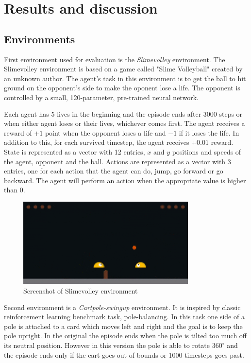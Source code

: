 \chapter{Results and discussion}
\section{Environments}

First environment used for evaluation is the \emph{Slimevolley} environment. The Slimevolley environment \cite{slimevolleygym} is based on a game called "Slime Volleyball" created by an unknown author. The agent's task in this environment is to get the ball to hit ground on the opponent's side to make the oponent lose a life. The opponent is controlled by a small, 120-parameter, pre-trained neural network. \cite{ha2015slimevolley}

Each agent has 5 lives in the beginning and the episode ends after 3000 steps or when either agent loses or their lives, whichever comes first. The agent receives a reward of $+1$ point when the opponent loses a life and $-1$ if it loses the life. In addition to this, for each survived timestep, the agent receives $+0.01$  reward. State is represented as a vector with 12 entries, $x$ and $y$ positions and speeds of the agent, opponent and the ball. Actions are represented as a vector with 3 entries, one for each action that the agent can do, jump, go forward or go backward. The agent will perform an action when the appropriate value is higher than 0.

\begin{figure}[h]
    \caption{Screenshot of Slimevolley environment}
    \includegraphics[width=0.8\textwidth]{img/slimevolley.png}
\end{figure}

Second environment is a \emph{Cartpole-swingup} environment. It is inspired by classic reinforcement learning benchmark task, pole-balancing. In this task one side of a pole is attached to a card which moves left and right and the goal is to keep the pole upright. In the original the episode ends when the pole is tilted too much off its neutral position. However in this version the pole is able to rotate $360^\circ$ and the episode ends only if the cart goes out of bounds or 1000 timesteps goes past.

